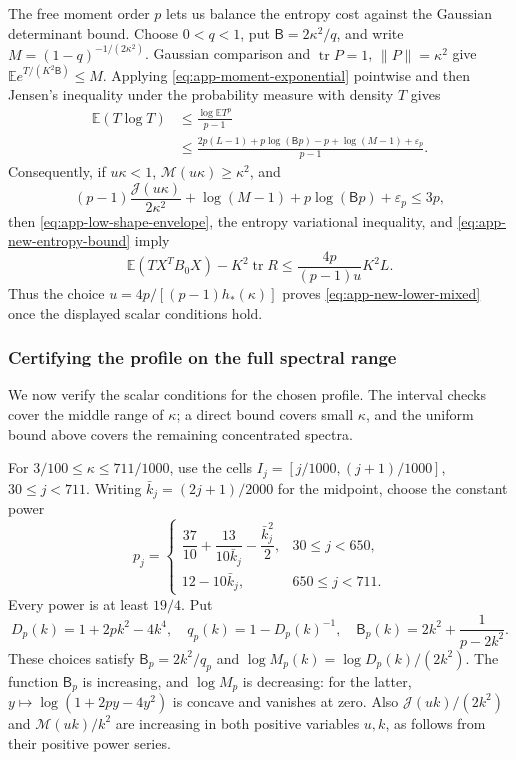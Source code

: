 \documentclass[11pt,a4paper]{article}
\numberwithin{equation}{section}
\begin{document}
The free moment order $p$ lets us balance the entropy cost against the
Gaussian determinant bound. Choose $0<q<1$, put $\mathsf B=2\kappa^2/q$, and write
$M=(1-q)^{-1/(2\kappa^2)}$.
Gaussian comparison and $\operatorname{tr}P=1$, $\|P\|=\kappa^2$
give $\mathbb E e^{T/(K^2\mathsf B)}\le M$.
Applying \eqref{eq:app-moment-exponential} pointwise and then Jensen's
inequality under the probability measure with density $T$ gives
\begin{equation}\label{eq:app-new-entropy-bound}
 \begin{split}
 \mathbb E(T\log T)
 &\le\frac{\log\mathbb ET^p}{p-1}\\
 &\le\frac{2p(L-1)+p\log(\mathsf Bp)-p
                   +\log(M-1)+\varepsilon_p}{p-1}.
 \end{split}
\end{equation}
Consequently, if $u\kappa<1$, $\mathcal M(u\kappa)\ge\kappa^2$, and
\begin{equation}\label{eq:app-new-entropy-condition}
 (p-1)\frac{\mathcal J(u\kappa)}{2\kappa^2}
       +\log(M-1)+p\log(\mathsf Bp)+\varepsilon_p\le3p,
\end{equation}
then \eqref{eq:app-low-shape-envelope}, the entropy variational
inequality, and \eqref{eq:app-new-entropy-bound} imply
\[
 \mathbb E(TX^TB_0X)-K^2\operatorname{tr}R
 \le \frac{4p}{(p-1)u}K^2L.
\]
Thus the choice $u=4p/[(p-1)h_*(\kappa)]$ proves
\eqref{eq:app-new-lower-mixed} once the displayed scalar conditions hold.

\subsubsection{Certifying the profile on the full spectral range}
We now verify the scalar conditions for the chosen profile. The interval
checks cover the middle range of $\kappa$; a direct bound covers small
$\kappa$, and the uniform bound above covers the remaining concentrated
spectra.

For $3/100\le\kappa\le711/1000$, use the cells
$I_j=[j/1000,(j+1)/1000]$, $30\le j<711$.
Writing $\bar k_j=(2j+1)/2000$ for the midpoint, choose the constant power
\[
 p_j=\begin{cases}
 \dfrac{37}{10}+\dfrac{13}{10\bar k_j}-\dfrac{\bar k_j^2}{2},&30\le j<650,\\[4pt]
 12-10\bar k_j,&650\le j<711.
 \end{cases}
\]
Every power is at least $19/4$.
Put
\[
 D_p(k)=1+2pk^2-4k^4,\quad
 q_p(k)=1-D_p(k)^{-1},\quad
 \mathsf B_p(k)=2k^2+\frac1{p-2k^2}.
\]
These choices satisfy $\mathsf B_p=2k^2/q_p$ and
$\log M_p(k)=\log D_p(k)/(2k^2)$.
The function $\mathsf B_p$ is increasing, and $\log M_p$ is decreasing:
for the latter, $y\mapsto\log(1+2py-4y^2)$ is concave and vanishes at
zero. Also $\mathcal J(uk)/(2k^2)$ and
$\mathcal M(uk)/k^2$ are increasing in both positive variables $u,k$,
as follows from their positive power series.
\end{document}

